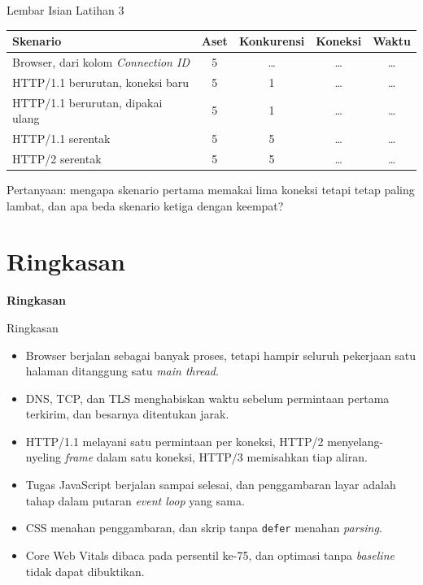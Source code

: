 \documentclass[aspectratio=169, table, 12pt]{beamer}
\begin{document}
\begin{frame}{{\Large Lembar Isian Latihan 3}}
  \vspace{5pt}
  \centering
  {\small
  \begin{tabularx}{0.97\textwidth}{Xcccc}
    \hline
    \textbf{Skenario} & \textbf{Aset} & \textbf{Konkurensi} & \textbf{Koneksi} & \textbf{Waktu} \\
    \hline
    Browser, dari kolom \emph{Connection ID} & 5 & \dots & \dots & \dots \\
    \hline
    HTTP/1.1 berurutan, koneksi baru & 5 & 1 & \dots & \dots \\
    \hline
    HTTP/1.1 berurutan, dipakai ulang & 5 & 1 & \dots & \dots \\
    \hline
    HTTP/1.1 serentak & 5 & 5 & \dots & \dots \\
    \hline
    HTTP/2 serentak & 5 & 5 & \dots & \dots \\
    \hline
  \end{tabularx}}

  \vspace{6pt}
  {\footnotesize Pertanyaan: mengapa skenario pertama memakai lima koneksi
  tetapi tetap paling lambat, dan apa beda skenario ketiga dengan keempat?}
\end{frame}

\section{Ringkasan}

\begin{frame}{\hfill}
  \centering
  \Huge{\textbf{Ringkasan}}
\end{frame}

\begin{frame}{{\Large Ringkasan}}
  \vspace{6pt}
  {\small
  \begin{itemize}
    \item Browser berjalan sebagai banyak proses, tetapi hampir seluruh
          pekerjaan satu halaman ditanggung satu \textit{main thread}.
    \item DNS, TCP, dan TLS menghabiskan waktu sebelum permintaan pertama
          terkirim, dan besarnya ditentukan jarak.
    \item HTTP/1.1 melayani satu permintaan per koneksi, HTTP/2
          menyelang-nyeling \textit{frame} dalam satu koneksi, HTTP/3
          memisahkan tiap aliran.
    \item Tugas JavaScript berjalan sampai selesai, dan penggambaran layar
          adalah tahap dalam putaran \textit{event loop} yang sama.
    \item CSS menahan penggambaran, dan skrip tanpa \texttt{defer} menahan
          \textit{parsing}.
    \item Core Web Vitals dibaca pada persentil ke-75, dan optimasi tanpa
          \textit{baseline} tidak dapat dibuktikan.
  \end{itemize}}
\end{frame}
\end{document}
